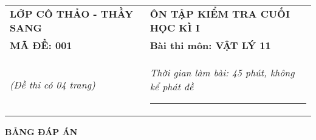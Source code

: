\begin{center}
	\begin{tabular}{M{9.25cm}M{8.75cm}}
		\textbf{LỚP CÔ THẢO - THẦY SANG}& \textbf{ÔN TẬP KIỂM TRA CUỐI HỌC KÌ I}\\
		\textbf{MÃ ĐỀ: 001}& \textbf{Bài thi môn: VẬT LÝ 11}\\
		\textit{(Đề thi có 04 trang)}& \textit{Thời gian làm bài: 45 phút, không kể phát đề}
		
		\noindent\rule{4cm}{0.8pt} \\
	\end{tabular}
\end{center}
\setcounter{section}{0}
\begin{center}
	\textbf{\large BẢNG ĐÁP ÁN}
\end{center}
\section{}
\section{}
\section{}
